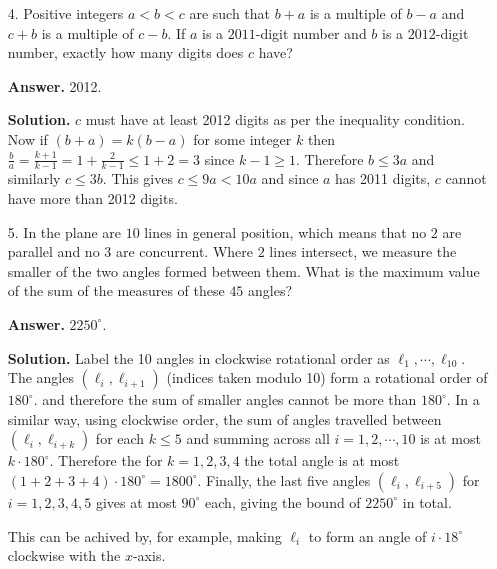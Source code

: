 \documentclass[11pt,a4paper]{article}
\begin{document}
\begin{enumerate}
	\item[4.] Positive integers $a < b < c$ are such that $b + a$ is a multiple of $b - a$ and $c + b$ is a multiple of $c-b$. If $a$ is a $2011$-digit number and $b$ is a $2012$-digit number, exactly how many digits does $c$ have?
	
	\textbf{Answer.} 2012. 
	
	\textbf{Solution.} $c$ must have at least 2012 digits as per the inequality condition. Now if $(b+a)=k(b-a)$ for some integer $k$ then $\frac{b}{a}=\frac{k+1}{k-1}=1+\frac{2}{k-1}\le 1+2=3$ since $k-1\ge 1$. Therefore $b\le 3a$ and similarly $c\le 3b$. This gives $c\le 9a<10a$ and since $a$ has 2011 digits, $c$ cannot have more than 2012 digits. 
	
	\item[5.] In the plane are $10$ lines in general position, which means that no $2$ are parallel and no $3$ are concurrent. Where $2$ lines intersect, we measure the smaller of the two angles formed between them. What is the maximum value of the sum of the measures of these $45$ angles?
	
	\textbf{Answer.} $2250^{\circ}$. 
	
	\textbf{Solution.} Label the 10 angles in clockwise rotational order as $\ell_1, \cdots , \ell_{10}$. The angles $(\ell_i, \ell_{i+1})$ (indices taken modulo 10) form a rotational order of $180^{\circ}$. and therefore the sum of smaller angles cannot be more than $180^{\circ}$. In a similar way, using clockwise order, the sum of angles travelled between $(\ell_i, \ell_{i+k})$ for each $k\le 5$ and summing across all $i=1, 2, \cdots , 10$ is at most $k\cdot 180^{\circ}$. Therefore the for $k=1, 2, 3, 4$ the total angle is at most $(1+2+3+4)\cdot 180^{\circ}=1800^{\circ}$. Finally, the last five angles $(\ell_i, \ell_{i+5})$ for $i=1,2,3,4,5$ gives at most $90^{\circ}$ each, giving the bound of $2250^{\circ}$ in total. 
	
	This can be achived by, for example, making $\ell_i$ to form an angle of $i\cdot 18^{\circ}$ clockwise with the $x$-axis. 
\end{enumerate}
\end{document}
